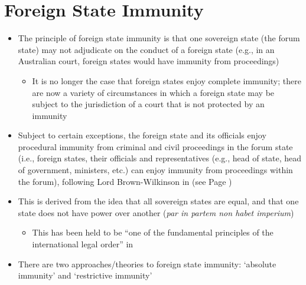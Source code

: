 \section{Foreign State Immunity}
\begin{itemize}
    \item The principle of foreign state immunity is that one sovereign state (the forum state) may not adjudicate on the conduct of a foreign state (e.g., in an Australian court, foreign states would have immunity from proceedings)
    \begin{itemize}
        \item It is no longer the case that foreign states enjoy complete immunity; there are now a variety of circumstances in which a foreign state may be subject to the jurisdiction of a court that is not protected by an immunity
    \end{itemize}
    \item Subject to certain exceptions, the foreign state and its officials enjoy procedural immunity from criminal and civil proceedings in the forum state (i.e., foreign states, their officials and representatives (e.g., head of state, head of government, ministers, etc.) can enjoy immunity from proceedings within the forum), following Lord Brown-Wilkinson in  (see Page \pageref{case:Pinochet (No 3)})
    \item This is derived from the idea that all sovereign states are equal, and that one state does not have power over another (\textit{par in partem non habet imperium})
    \begin{itemize}
        \item This has been held to be ``one of the fundamental principles of the international legal order'' in 
    \end{itemize}
    \item There are two approaches/theories to foreign state immunity: `absolute immunity' and `restrictive immunity'
\end{itemize}

